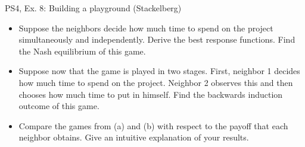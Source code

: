 \begin{frame}{PS4, Ex. 8: Building a playground (Stackelberg)}
  \begin{multicols}{2}
    \begin{itemize}
      \item[(a)] Suppose the neighbors decide how much time to spend on the project simultaneously and independently. Derive the best response functions. Find the Nash equilibrium of this game.
    \end{itemize}
  \vfill\null \columnbreak
    \begin{itemize}
      \item[(b)] Suppose now that the game is played in two stages. First, neighbor 1 decides how much time to spend on the project. Neighbor 2 observes this and then chooses how much time to put in himself. Find the backwards induction outcome of this game.
    \end{itemize}
    \begin{itemize}
      \item[(c)] Compare the games from (a) and (b) with respect to the payoff that each neighbor obtains. Give an intuitive explanation of your results.
    \end{itemize}
  \vfill\null
  \end{multicols}
\end{frame}



%


